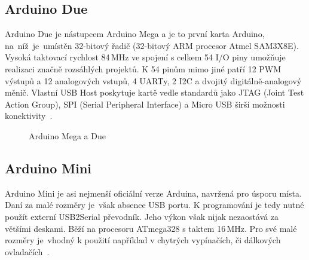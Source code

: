		\subsection{Arduino Due} 
		Arduino Due je nástupcem Arduino Mega a je to první karta Arduino, na~níž~je~umístěn 32-bitový řadič (32-bitový ARM procesor
		Atmel SAM3X8E). Vysoká taktovací rychlost 84\,MHz ve spojení s celkem 54 I/O piny umožňuje realizaci značně rozsáhlých projektů. K 54 pinům mimo jiné patří 12 PWM výstupů a 12 analogových vstupů, 4 UARTy, 2 I2C a dvojitý digitálně-analogový měnič. Vlastní USB Host poskytuje kartě vedle standardů jako JTAG (Joint Test Action Group), SPI (Serial Peripheral Interface) a Micro USB širší možnosti konektivity~\cite{ArduinoDue}.	

\begin{figure}[!ht]
    \centering
			\hspace*{5mm}
		\caption{Arduino Mega a Due}
		\vspace{-20pt}	
\end{figure}


	\subsection{Arduino Mini} 
	Arduino Mini je asi nejmenší oficiální verze Arduina, navržená pro úsporu místa. Daní za malé rozměry je~však absence USB portu. K programování je tedy nutné použít externí USB2Serial převodník. Jeho výkon však nijak nezaostává za většími deskami. Běží na procesoru ATmega328 s taktem 16\,MHz. Pro své malé rozměry je~vhodný k použití například v chytrých vypínačích, či dálkových ovladačích~\cite{ArduinoMini}.	
	
